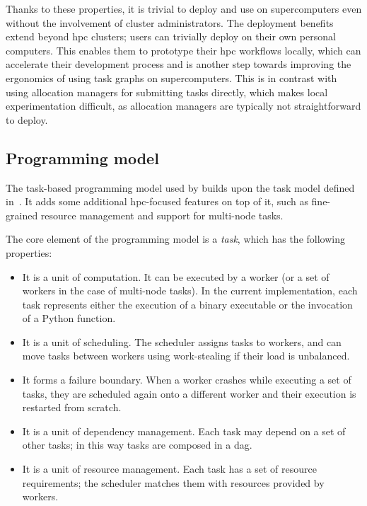 Thanks to these properties, it is trivial to deploy and use \hyperqueue{} on
supercomputers even without the involvement of cluster administrators. The deployment benefits
extend beyond \gls{hpc} clusters; users can trivially deploy \hyperqueue{}
on their own personal computers. This enables them to prototype their \gls{hpc}
workflows locally, which can accelerate their development process and is another step towards
improving the ergonomics of using task graphs on supercomputers. This is in contrast with using
allocation managers for submitting tasks directly, which makes local experimentation difficult, as
allocation managers are typically not straightforward to deploy.

\subsection{Programming model}
\label{sec:hq-programming-model}
The task-based programming model used by \hyperqueue{} builds upon the task model defined
in~. It adds some additional \gls{hpc}-focused features on top
of it, such as fine-grained resource management and support for multi-node tasks.

The core element of the programming model is a \emph{task}, which has the following
properties:
\begin{itemize}[itemsep=0pt,topsep=4pt]
	\item It is a unit of computation. It can be executed by a worker (or a set of workers in the case of
	      multi-node tasks). In the current implementation, each task represents either the execution of a
	      binary executable or the invocation of a Python function.
	\item It is a unit of scheduling. The scheduler assigns tasks to workers, and can move tasks between
	      workers using work-stealing if their load is unbalanced.
	\item It forms a failure boundary. When a worker crashes while executing a set of tasks, they are
	      scheduled again onto a different worker and their execution is restarted from scratch.
	\item It is a unit of dependency management. Each task may depend on a set of other tasks; in this way
	      tasks are composed in a \gls{dag}.
	\item It is a unit of resource management. Each task has a set of resource requirements; the scheduler
	      matches them with resources provided by workers.
\end{itemize}

